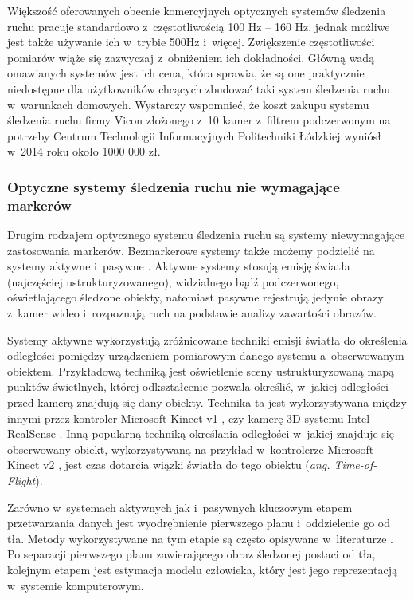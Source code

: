 Większość oferowanych obecnie komercyjnych optycznych systemów śledzenia ruchu pracuje standardowo z~częstotliwością 100 Hz -- 160 Hz, jednak możliwe jest także używanie ich w~trybie 500Hz i~więcej. Zwiększenie częstotliwości pomiarów wiąże się zazwyczaj z~obniżeniem ich dokładności.
Główną wadą omawianych systemów jest ich cena, która sprawia, że są one praktycznie niedostępne dla użytkowników chcących zbudować taki system śledzenia ruchu w~warunkach domowych. Wystarczy wspomnieć, że koszt zakupu systemu śledzenia ruchu firmy Vicon złożonego z~10 kamer z~filtrem podczerwonym na potrzeby Centrum Technologii Informacyjnych Politechniki Łódzkiej  wyniósł w~2014 roku około 1000 000 zł.
			 
\subsubsection*{Optyczne systemy śledzenia ruchu nie wymagające markerów}\label{chap:mocaps:Kinect}
Drugim rodzajem optycznego systemu śledzenia ruchu są systemy niewymagające zastosowania markerów. Bezmarkerowe systemy także możemy podzielić na systemy aktywne i~pasywne \cite{Mundermann2006}. Aktywne systemy stosują emisję światła (najczęściej ustrukturyzowanego), widzialnego bądź podczerwonego, oświetlającego śledzone obiekty, natomiast pasywne rejestrują jedynie obrazy z~kamer wideo i~rozpoznają ruch na podstawie analizy zawartości obrazów. 

Systemy aktywne wykorzystują zróżnicowane techniki emisji światła do określenia odległości pomiędzy urządzeniem pomiarowym danego systemu a~obserwowanym obiektem. Przykładową techniką jest oświetlenie sceny ustrukturyzowaną mapą punktów świetlnych, której odkształcenie pozwala określić, w~jakiej odległości przed kamerą znajdują się dany obiekty. Technika ta jest wykorzystywana między innymi przez kontroler Microsoft Kinect v1 , czy kamerę 3D systemu Intel RealSense . Inną popularną techniką określania odległości w~jakiej znajduje się obserwowany obiekt, wykorzystywaną na przykład w~kontrolerze Microsoft Kinect v2 , jest czas dotarcia wiązki światła do tego obiektu (\emph{ang. Time-of-Flight})\cite{Hansard2013}.
			
Zarówno w~systemach aktywnych jak i~pasywnych kluczowym etapem przetwarzania danych jest wyodrębnienie pierwszego planu i~oddzielenie go od tła. Metody wykorzystywane na tym etapie są często opisywane w~literaturze \cite{wang2003recent, rosenhahn2008markerless, guan2009estimating, surer2011markerless, corazza2006markerless}. Po separacji pierwszego planu zawierającego obraz śledzonej postaci od tła, kolejnym etapem jest estymacja modelu człowieka, który jest jego reprezentacją w~systemie komputerowym.\\ 
			
